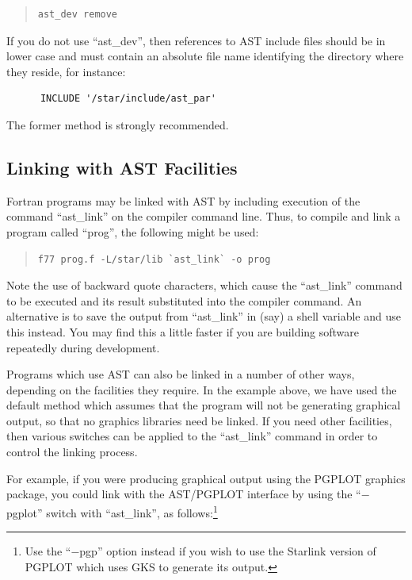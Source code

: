 \documentclass[twoside,11pt]{article}
\newcommand{\htmlref}[2]{#1}
\begin{document}
\begin{quote}
\small
\begin{verbatim}
ast_dev remove
\end{verbatim}
\normalsize
\end{quote}

If you do not use ``ast\_dev'', then references to AST include files
should be in lower case and must contain an absolute file name
identifying the directory where they reside, for instance:

\small
\begin{verbatim}
      INCLUDE '/star/include/ast_par'
\end{verbatim}
\normalsize

The former method is strongly recommended.

\subsection{\label{ss:linking}Linking with AST Facilities}

Fortran programs may be linked with AST by including execution of the
command ``\htmlref{ast\_link}{ast_link}'' on the compiler command line. Thus, to compile
and link a program called ``prog'', the following might be used:

\begin{quote}
\small
\begin{verbatim}
f77 prog.f -L/star/lib `ast_link` -o prog
\end{verbatim}
\normalsize
\end{quote}

Note the use of backward quote characters, which cause the
``ast\_link'' command to be executed and its result substituted into
the compiler command. An alternative is to save the output from
``ast\_link'' in (say) a shell variable and use this instead. You may
find this a little faster if you are building software repeatedly
during development.

Programs which use AST can also be linked in a number of other ways,
depending on the facilities they require. In the example above, we
have used the default method which assumes that the program will not
be generating graphical output, so that no graphics libraries need be
linked. If you need other facilities, then various switches can be
applied to the ``ast\_link'' command in order to control the linking
process.

For example, if you were producing graphical output using the PGPLOT
graphics package, you could link with the AST/PGPLOT interface by
using the ``$-$pgplot'' switch with ``ast\_link'', as
follows:\footnote{Use the ``$-$pgp'' option instead if you wish to use
the Starlink version of PGPLOT which uses GKS to generate its output.}
\end{document}
